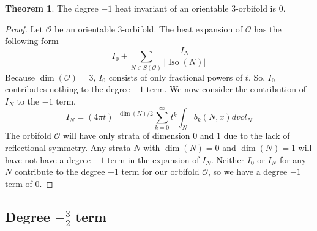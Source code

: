 \documentclass[12pt]{article}
\newcommand{\myabs}[1]{\vert#1\vert}
\theoremstyle{definition}
\newtheorem{theorem}{Theorem}[section]
\DeclareMathOperator{\iso}{Iso}
\begin{document}
\begin{theorem}
    The degree $-1$ heat invariant of an orientable $3$-orbifold is $0$.
\end{theorem}
\begin{proof}
    Let $\mathcal{O}$ be an orientable $3$-orbifold. The heat expansion of $\mathcal{O}$ has the following form
    \begin{equation*}
        I_0+\sum_{N \in S(\mathcal{O})}\frac{I_N}{\myabs{\iso(N)}}
    \end{equation*}
    Because $\dim({\mathcal{O}})=3$, $I_0$ consists of only fractional powers of $t$. So, $I_0$ contributes nothing to the degree $-1$ term. We now consider the contribution of $I_N$ to the $-1$ term.
    \begin{equation*}
    I_N = {(4\pi t)}^{-\dim(N)/2}\sum_{k=0}^{\infty}t^k\int_{N}b_k(N,x)dvol_N
    \end{equation*}
    The orbifold $\mathcal{O}$ will have only strata of dimension $0$ and $1$ due to the lack of reflectional symmetry. Any strata $N$ with $\dim({N})=0$ and $\dim({N})=1$ will have not have a degree $-1$ term in the expansion of $I_N$. Neither $I_0$ or $I_N$ for any $N$ contribute to the degree $-1$ term for our orbifold $\mathcal{O}$, so we have a degree $-1$ term of $0$.
\end{proof}

\subsection{Degree $-\frac{3}{2}$ term}
\end{document}
